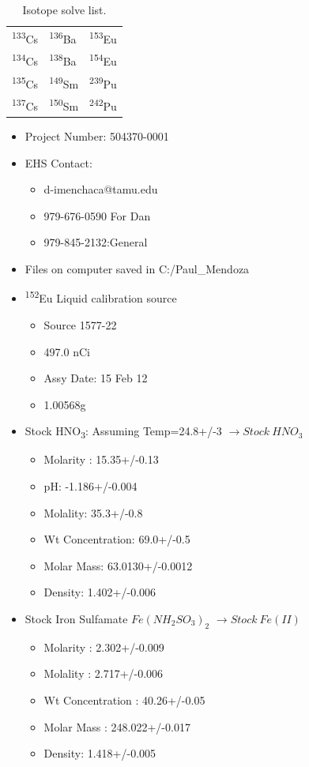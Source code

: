 \documentclass[idxtotoc,hyperref,openany,oneside]{labbook} %
\newcommand{\tss}{\textsuperscript}
\newcommand{\tsbs}{\textsubscript}
\begin{document}
\begin{table}[H]
\begin{center}
\begin{tabular}{l l l}
\toprule
\tss{133}Cs & \tss{136}Ba & \tss{153}Eu\\ 
\tss{134}Cs & \tss{138}Ba & \tss{154}Eu\\
\tss{135}Cs & \tss{149}Sm & \tss{239}Pu\\
\tss{137}Cs & \tss{150}Sm & \tss{242}Pu\\
\bottomrule
\end{tabular}
\caption{Isotope solve list.}
\end{center}
\end{table}  


\begin{itemize}
\item{Project Number: 504370-0001}
\item{EHS Contact:}
  \begin{itemize}
  \item{d-imenchaca@tamu.edu}
  \item{979-676-0590 For Dan}
  \item{979-845-2132:General}
  \end{itemize}
\item{Files on computer saved in C:/Paul\_Mendoza}
\item{\tss{152}Eu Liquid calibration source}
  \begin{itemize}
  \item{Source 1577-22}
  \item{497.0 nCi}
  \item{Assy Date: 15 Feb 12}
  \item{1.00568g}
  \end{itemize}
\item{Stock HNO\tsbs{3}: Assuming Temp=24.8+/-3 $\rightarrow\boxed{Stock\ HNO_3}$}
  \begin{itemize}
  \item{Molarity : 15.35+/-0.13}
  \item{pH: -1.186+/-0.004}
  \item{Molality: 35.3+/-0.8}
  \item{Wt Concentration: 69.0+/-0.5}
  \item{Molar Mass: 63.0130+/-0.0012}
  \item{Density: 1.402+/-0.006}
  \end{itemize}
\item{Stock Iron Sulfamate $Fe(NH_2SO_3)_2$ $\rightarrow\boxed{Stock\ Fe(II)}$}
  \begin{itemize}
  \item{Molarity : 2.302+/-0.009}
  \item{Molality : 2.717+/-0.006}
  \item{Wt Concentration : 40.26+/-0.05}
  \item{Molar Mass : 248.022+/-0.017}
  \item{Density: 1.418+/-0.005}
  \end{itemize}
\end{itemize}
\end{document}
